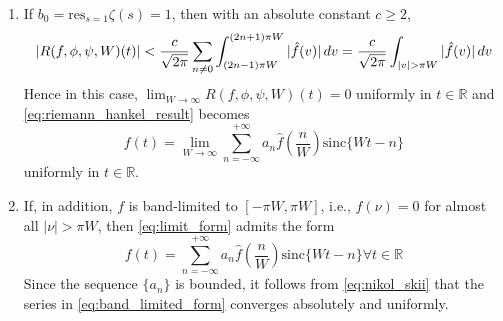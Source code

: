 \documentclass{article}
\newcommand{\tmdummy}{$\mbox{}$}
\begin{document}
\begin{remark}
  \label{rem:sampling_remarks}{\tmdummy}
  
  \begin{enumerate}
    \item If $b_0 = \mathrm{res}_{s = 1} \zeta (s) = 1$, then with an absolute
    constant $c \geq 2$,
    \begin{equation}
      |R (f, \phi, \psi, W) (t) | < \frac{c}{\sqrt{2 \pi}}  \sum_{n \neq 0}
      \int_{(2 n - 1) \pi W}^{(2 n + 1) \pi W} | \hat{f} (v) | \hspace{0.17em}
      dv = \frac{c}{\sqrt{2 \pi}}  \int_{|v| > \pi W} | \hat{f} (v) | 
      \hspace{0.17em} dv \label{eq:remainder_zeta}
    \end{equation}
    Hence in this case, $\lim_{W \to \infty} R (f, \phi, \psi, W) (t) = 0$
    uniformly in $t \in \mathbb{R}$ and \eqref{eq:riemann_hankel_result}
    becomes
    \begin{equation}
      f (t) = \lim_{W \to \infty}  \sum_{n = - \infty}^{+ \infty} a_n  \hat{f}
      \left( \frac{n}{W} \right) \mathrm{sinc} \{Wt - n\}
      \label{eq:limit_form}
    \end{equation}
    uniformly in $t \in \mathbb{R}$.
    
    \item If, in addition, $f$ is band-limited to $[- \pi W, \pi W]$, i.e.,
    $\hat{f} (\nu) = 0$ for almost all $| \nu | > \pi W$, then
    \eqref{eq:limit_form} admits the form
    \begin{equation}
      f (t) = \sum_{n = - \infty}^{+ \infty} a_n  \hat{f} \left( \frac{n}{W}
      \right) \mathrm{sinc} \{Wt - n\} \forall t \in \mathbb{R}
      \label{eq:band_limited_form}
    \end{equation}
    Since the sequence $\{a_n \}$ is bounded, it follows from
    \eqref{eq:nikol_skii} that the series in \eqref{eq:band_limited_form}
    converges absolutely and uniformly.
    

\end{enumerate}
\end{remark}
\end{document}
